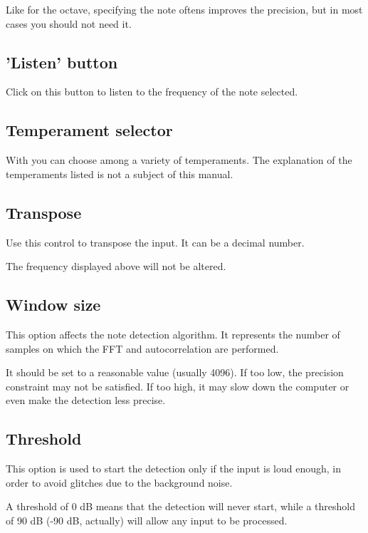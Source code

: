 Like for the octave, specifying the note oftens improves the precision,
but in most cases you should not need it.

\subsection{'Listen' button}\label{listen}

Click on this button to listen to the frequency of the note selected.

\subsection{Temperament selector}\label{temperament}

With  you can choose among a variety of temperaments.
The explanation of the temperaments listed is not a subject of this
manual.

\subsection{Transpose}\label{transpose}

Use this control to transpose the input. It can be a decimal number.

The frequency displayed above will not be altered.

\subsection{Window size}\label{windowsize}

This option affects the note detection algorithm. It represents the number
of samples on which the FFT and autocorrelation are performed.

It should be set to a reasonable value (usually 4096).
If too low, the precision constraint may not be satisfied. If too high,
it may slow down the computer or even make the detection less precise.

\subsection{Threshold}\label{threshold}

This option is used to start the detection only if the input is loud enough,
in order to avoid glitches due to the background noise.

A threshold of 0 dB means that the detection will never start, while a threshold
of 90 dB (-90 dB, actually) will allow any input to be processed.

